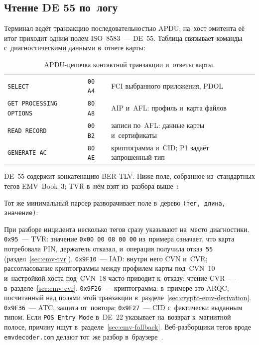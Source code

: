 \subsection*{Чтение DE 55 по~логу}\label{sec:emv-de55-reading}

Терминал ведёт транзакцию последовательностью APDU; на~хост эмитента её итог приходит
одним полем ISO~8583~--- DE~55. Таблица связывает команды с~диагностическими
данными в~ответе карты:

\begin{table}[!htbp]
  \caption{APDU-цепочка контактной транзакции и~ответы карты.}\label{tab:emv-apdu-trace}
  \begingroup
  \tablesetup
  \begin{tabularx}{0.85\textwidth}{@{}P{11em} P{4.5em} Y@{}}
    \toprule
    \headrow
     &  &  \\
    \midrule
    \texttt{SELECT} & \texttt{00 A4} & FCI выбранного приложения, PDOL \\
    \rowsep
    \texttt{GET PROCESSING OPTIONS} & \texttt{80 A8} & AIP и~AFL: профиль и~карта файлов \\
    \rowsep
    \texttt{READ RECORD} & \texttt{00 B2} & записи по~AFL: данные карты и~сертификаты \\
    \rowsep
    \texttt{GENERATE AC} & \texttt{80 AE} & криптограмма и~CID; P1 задаёт запрошенный тип \\
    \bottomrule
  \end{tabularx}\par
  \endgroup
\end{table}

DE~55 содержит конкатенацию BER-TLV. Ниже поле, собранное из~стандартных тегов
EMV~Book~3; TVR в~нём взят из~разбора выше~\cite{emvco-book3}:


Тот же минимальный парсер разворачивает поле
в~дерево \texttt{(тег, длина, значение)}:


При разборе инцидента несколько тегов сразу указывают на~место диагностики.
\texttt{0x95}~--- TVR: значение \texttt{0x00\,00\,08\,00\,00} из~примера
означает, что карта потребовала PIN, держатель отказал, и~операция получила
отказ~\texttt{55} (раздел~\ref{sec:emv-tvr}). \texttt{0x9F10}~--- IAD: внутри
него CVN и~CVR; рассогласование криптограммы между профилем карты под~CVN~10
и~настройкой хоста под~CVN~18 часто приводит к~отказу; чтение CVR~--- в~разделе~\ref{sec:emv-cvr}.
\texttt{0x9F26}~--- криптограмма: в~примере это ARQC, посчитанный над полями
этой транзакции в~разделе~\ref{sec:crypto-emv-derivation}. \texttt{0x9F36}~---
ATC, защита от~повтора; \texttt{0x9F27}~--- CID с~фактически выданным типом.
Если \texttt{POS Entry Mode} в~DE~22 указывает на~возврат к~магнитной полосе,
причину ищут в~разделе~\ref{sec:emv-fallback}. Веб-разборщики тегов вроде
\texttt{emvdecoder.com} делают тот~же разбор в~браузере~\cite{emvdecoder}.

